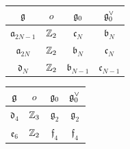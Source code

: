 
\begin{center}
\begin{tabular}{cccc}
\toprule
$\mathfrak{g}$ & $o$ & $\mathfrak{g}_0$ & $\mathfrak{g}_0^{\vee}$ \\
\midrule
$\mathfrak{a}_{2N-1}$ & $\mathbb{Z}_2$ & $\mathfrak{c}_N$ & $\mathfrak{b}_N$ \\
$\mathfrak{a}_{2N}$   & $\mathbb{Z}_2$ & $\mathfrak{b}_N$ & $\mathfrak{c}_N$ \\
$\mathfrak{d}_N$      & $\mathbb{Z}_2$ & $\mathfrak{b}_{N-1}$ & $\mathfrak{c}_{N-1}$ \\
\bottomrule
\end{tabular}
\hspace{2.4em}
\begin{tabular}{cccc}
\toprule
$\mathfrak{g}$ & $o$ & $\mathfrak{g}_0$ & $\mathfrak{g}_0^{\vee}$ \\
\midrule
$\mathfrak{d}_4$ & $\mathbb{Z}_3$ & $\mathfrak{g}_2$ & $\mathfrak{g}_2$ \\
$\mathfrak{e}_6$ & $\mathbb{Z}_2$ & $\mathfrak{f}_4$ & $\mathfrak{f}_4$ \\
\bottomrule
\end{tabular}
\end{center}


